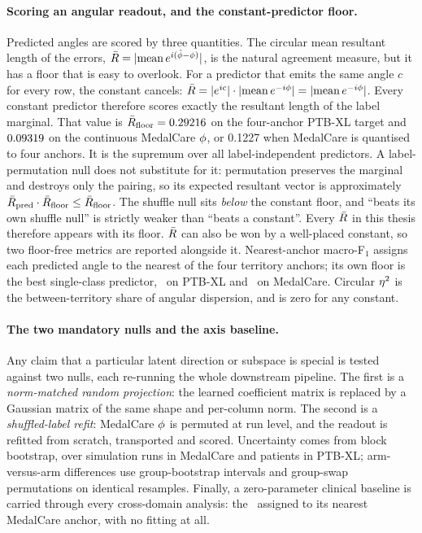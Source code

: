 \paragraph{Scoring an angular readout, and the constant-predictor floor.}
Predicted angles are scored by three quantities. The circular mean resultant length of the errors, $\bar{R} = |\mathrm{mean}\,e^{i(\hat\phi-\phi)}|$, is the natural agreement measure, but it has a floor that is easy to overlook. For a predictor that emits the same angle $c$ for every row, the constant cancels: $\bar{R} = |e^{ic}|\cdot|\mathrm{mean}\,e^{-i\phi}| = |\mathrm{mean}\,e^{-i\phi}|$. Every constant predictor therefore scores exactly the resultant length of the label marginal. That value is $\bar{R}_{\mathrm{floor}} = 0.29216$ on the four-anchor PTB-XL target and $0.09319$ on the continuous MedalCare $\phi$, or 0.1227 when MedalCare is quantised to four anchors. It is the supremum over all label-independent predictors. A label-permutation null does not substitute for it: permutation preserves the marginal and destroys only the pairing, so its expected resultant vector is approximately $\bar{R}_{\mathrm{pred}}\cdot\bar{R}_{\mathrm{floor}} \le \bar{R}_{\mathrm{floor}}$. The shuffle null sits \emph{below} the constant floor, and ``beats its own shuffle null'' is strictly weaker than ``beats a constant''. Every $\bar{R}$ in this thesis therefore appears with its floor.  $\bar{R}$ can also be won by a well-placed constant, so two floor-free metrics are reported alongside it. Nearest-anchor macro-F$_1$ assigns each predicted angle to the nearest of the four territory anchors; its own floor is the best single-class predictor, \Ffloorptb\ on PTB-XL and \Ffloormedal\ on MedalCare. Circular $\eta^{2}$ is the between-territory share of angular dispersion, and is zero for any constant. 

\paragraph{The two mandatory nulls and the axis baseline.}
Any claim that a particular latent direction or subspace is special is tested against two nulls, each re-running the whole downstream pipeline. The first is a \emph{norm-matched random projection}: the learned coefficient matrix is replaced by a Gaussian matrix of the same shape and per-column norm. The second is a \emph{shuffled-label refit}: MedalCare $\phi$ is permuted at run level, and the readout is refitted from scratch, transported and scored. Uncertainty comes from block bootstrap, over simulation runs in MedalCare and patients in PTB-XL; arm-versus-arm differences use group-bootstrap intervals and group-swap permutations on identical resamples. Finally, a zero-parameter clinical baseline is carried through every cross-domain analysis: the \axisfeat\ assigned to its nearest MedalCare anchor, with no fitting at all. 

